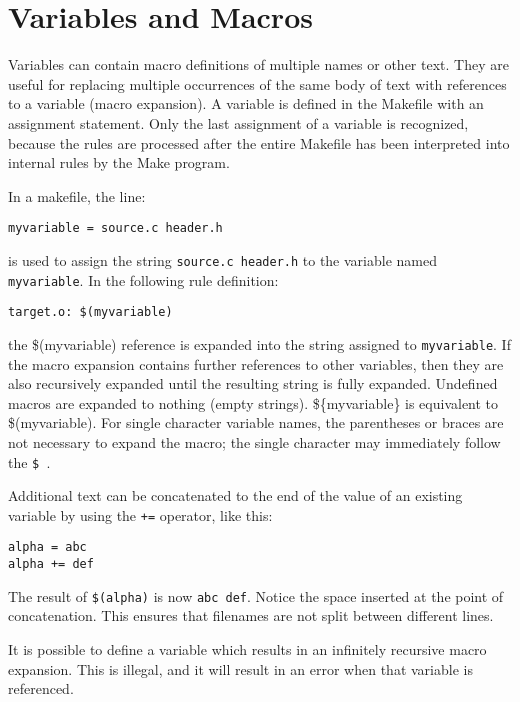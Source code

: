 \section{Variables and Macros}

\label{varass}

Variables can contain macro definitions of multiple names or other
text.  They are useful for replacing multiple occurrences of the same body
of text with references to a variable (macro expansion).  A variable is
defined in the Makefile with an assignment statement.  Only the last
assignment of a variable is recognized, because the rules are processed
after the entire Makefile has been interpreted into internal rules by the
Make program.

In a makefile, the line:

\begin{verbatim}
myvariable = source.c header.h
\end{verbatim}

is used to assign the string {\tt source.c header.h} to the variable named
{\tt myvariable}.  In the following rule definition:

\begin{verbatim}
target.o: $(myvariable)
\end{verbatim}

the \$(myvariable) reference is expanded into the string assigned to
{\tt myvariable}.  If the macro expansion contains further references to other
variables, then they are also recursively expanded until the resulting
string is fully expanded.  Undefined macros are expanded to nothing (empty
strings).  \$\{myvariable\} is equivalent to \$(myvariable).
For single character variable names, the parentheses or braces are not
necessary to expand the macro; the single character may immediately follow
the {\tt\$ }.

Additional text can be concatenated to the end of the value of an existing
variable by using the {\tt +=} operator, like this:

\begin{verbatim}
alpha = abc
alpha += def
\end{verbatim}

The result of {\tt\$(alpha)} is now {\tt abc def}.  Notice the space
inserted at the point of concatenation.  This ensures that filenames are
not split between different lines.

It is possible to define a variable which results in an infinitely
recursive macro expansion.  This is illegal, and it will result in an error
when that variable is referenced.

